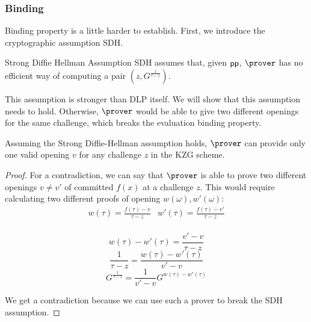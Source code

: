 
\subsubsection{Binding}
Binding property is a little harder to establish. First, we introduce the cryptographic assumption SDH.

\begin{definition}{Strong Diffie Hellman Assumption}
    SDH assumes that, given $\mathsf{pp}$, $\prover$ has no efficient way of computing a pair $(z, G^{\frac{1}{\tau - z}})$. 
\end{definition}

This assumption is stronger than DLP itself. We will show that this assumption needs to hold. Otherwise, $\prover$ would be able to give two different openings for the same challenge, which breaks the evaluation binding property.

\begin{lemma}
    Assuming the Strong Diffie-Hellman assumption holds, $\prover$ can provide only one valid opening $v$ for any challenge $z$ in the KZG scheme. 
\end{lemma}

\begin{proof}
    For a contradiction, we can say that $\prover$ is able to prove two different openings $v \neq v'$ of committed $f(x)$ at a challenge $z$. This would require calculating two different proofs of opening $w(\omega), w'(\omega)$:
    \[
    \begin{array}{cc}
         w(\tau) = \frac{f(\tau) - v}{\tau - z} & w'(\tau) = \frac{f(\tau) - v'}{\tau - z} \\
    \end{array}
    \]
    
    $$w(\tau) - w'(\tau) = \frac{v' - v}{\tau - z}$$
    $$\frac{1}{\tau - z} = \frac{w(\tau) - w'(\tau)}{v' - v}$$
    $$G^{\frac{1}{\tau - z}} = \frac{1}{{v' - v}}G^{w(\tau) - w'(\tau)}$$

    We get a contradiction because we can use such a prover to break the SDH assumption.
\end{proof}

